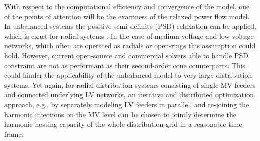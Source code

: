\documentclass[10pt]{article}
\begin{document}
\begin{tcolorbox}[colback=black!5!white,colframe=black]
With respect to the computational efficiency and convergence of the model, one of the points of attention will be the exactness of the relaxed power flow model. In unbalanced systems the positive semi-definite (PSD) relaxation can be applied, which is exact for radial systems \cite{geth_pitfalls_2023} . In the case of medium voltage and low voltage networks, which often are operated as radials or open-rings this assumption could hold. However, current open-source and commercial solvers able to handle PSD constraint are not as performant as their second-order cone counterparts. This could hinder the applicability of the unbalanced model to very large distribution systems. Yet again, for radial distribution systems consisting of single MV feeders and connected underlying LV networks, an iterative and distributed optimization approach, e.g., by separately modeling LV feeders in parallel, and re-joining the harmonic injections on the MV level can be chosen to jointly determine the harmonic hosting capacity of the whole distribution grid in a reasonable time frame.


\end{tcolorbox}

\newpage



\end{document}
